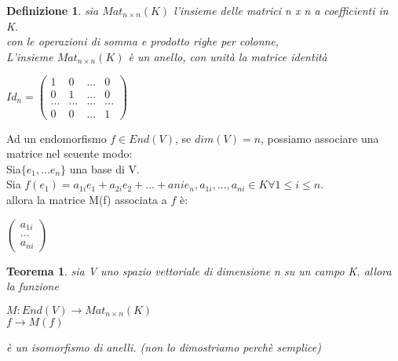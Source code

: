 \documentclass[a4paper,12pt]{article}
\theoremstyle{def}
\newtheorem*{definition}{Definizione}
\theoremstyle{prop}
\theoremstyle{esempio}
\theoremstyle{dimostrazione}
\theoremstyle{teo}
\newtheorem*{teorema}{Teorema}
\theoremstyle{osservazione}
\begin{document}
\begin{definition}
	sia \(Mat_{n \times n}(K)\) l'insieme delle matrici n x n a coefficienti in K.\\
	con le operazioni di somma e prodotto righe per colonne,\\
	L'insieme \(Mat_{n \times n}(K)\) è un anello, con unità la matrice identità
	\begin{center}
		\(Id_n = \begin{pmatrix}
			1   & 0   & ... & 0   \\
			0   & 1   & ... & 0   \\
			... & ... & ... & ... \\
			0   & 0   & ... & 1
		\end{pmatrix}\)
	\end{center}
\end{definition}

Ad un endomorfismo \(f \in End(V)\), se \(dim(V) = n\), possiamo associare una matrice nel seuente modo:\\
Sia\(\{e_1, ... e_n\}\) una base di V.\\
Sia \(f(e_1) = a_{1i} e_1 + a_{2i} e_2 + ... + a{ni} e_n, a_{1i},...,a_{ni} \in K \forall 1 \leq i \leq n\).\\
allora la matrice M(f) associata a \(f\) è:
\begin{center}
	\(\begin{pmatrix}
		a_{1i} \\
		...    \\
		a_{ni}
	\end{pmatrix}\)
\end{center}

\begin{teorema}
	sia V uno spazio vettoriale di dimensione n su un campo K. allora la funzione 
	\begin{center}
		\(M: End(V) \rightarrow Mat_{n \times n}(K)\)\\
		\(f \rightarrow M(f)\)
	\end{center}
	è un isomorfismo di anelli. (non lo dimostriamo perchè semplice)
\end{teorema}
\end{document}

